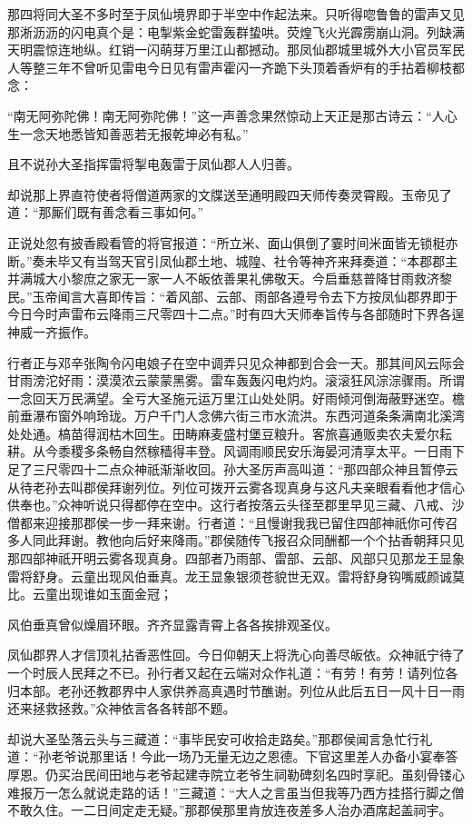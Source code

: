 \documentclass[12pt,UTF8]{ctexbook}
\begin{document}
{	那四将同大圣不多时至于凤仙境界即于半空中作起法来。只听得唿鲁鲁的雷声又见那淅沥沥的闪电真个是：电掣紫金蛇雷轰群蛰哄。荧煌飞火光霹雳崩山洞。列缺满天明震惊连地纵。红销一闪萌芽万里江山都撼动。那凤仙郡城里城外大小官员军民人等整三年不曾听见雷电今日见有雷声霍闪一齐跪下头顶着香炉有的手拈着柳枝都念：
	
	“南无阿弥陀佛！南无阿弥陀佛！”这一声善念果然惊动上天正是那古诗云：“人心生一念天地悉皆知善恶若无报乾坤必有私。”
	
	且不说孙大圣指挥雷将掣电轰雷于凤仙郡人人归善。
	
	却说那上界直符使者将僧道两家的文牒送至通明殿四天师传奏灵霄殿。玉帝见了道：“那厮们既有善念看三事如何。”
	
	正说处忽有披香殿看管的将官报道：“所立米、面山俱倒了霎时间米面皆无锁梃亦断。”奏未毕又有当驾天官引凤仙郡土地、城隍、社令等神齐来拜奏道：“本郡郡主并满城大小黎庶之家无一家一人不皈依善果礼佛敬天。今启垂慈普降甘雨救济黎民。”玉帝闻言大喜即传旨：“着风部、云部、雨部各遵号令去下方按凤仙郡界即于今日今时声雷布云降雨三尺零四十二点。”时有四大天师奉旨传与各部随时下界各逞神威一齐振作。
	
	行者正与邓辛张陶令闪电娘子在空中调弄只见众神都到合会一天。那其间风云际会甘雨滂沱好雨：漠漠浓云蒙蒙黑雾。雷车轰轰闪电灼灼。滚滚狂风淙淙骤雨。所谓一念回天万民满望。全亏大圣施元运万里江山处处阴。好雨倾河倒海蔽野迷空。檐前垂瀑布窗外响玲珑。万户千门人念佛六街三市水流洪。东西河道条条满南北溪湾处处通。槁苗得润枯木回生。田畴麻麦盛村堡豆粮升。客旅喜通贩卖农夫爱尔耘耕。从今黍稷多条畅自然稼穑得丰登。风调雨顺民安乐海晏河清享太平。一日雨下足了三尺零四十二点众神祇渐渐收回。孙大圣厉声高叫道：“那四部众神且暂停云从待老孙去叫郡侯拜谢列位。列位可拨开云雾各现真身与这凡夫亲眼看看他才信心供奉也。”众神听说只得都停在空中。这行者按落云头径至郡里早见三藏、八戒、沙僧都来迎接那郡侯一步一拜来谢。行者道：“且慢谢我我已留住四部神祇你可传召多人同此拜谢。教他向后好来降雨。”郡侯随传飞报召众同酬都一个个拈香朝拜只见那四部神祇开明云雾各现真身。四部者乃雨部、雷部、云部、风部只见那龙王显象雷将舒身。云童出现风伯垂真。龙王显象银须苍貌世无双。雷将舒身钩嘴威颜诚莫比。云童出现谁如玉面金冠；
	
	风伯垂真曾似燥眉环眼。齐齐显露青霄上各各挨排观圣仪。
	
	凤仙郡界人才信顶礼拈香恶性回。今日仰朝天上将洗心向善尽皈依。众神祇宁待了一个时辰人民拜之不已。孙行者又起在云端对众作礼道：“有劳！有劳！请列位各归本部。老孙还教郡界中人家供养高真遇时节醮谢。列位从此后五日一风十日一雨还来拯救拯救。”众神依言各各转部不题。
	
	却说大圣坠落云头与三藏道：“事毕民安可收拾走路矣。”那郡侯闻言急忙行礼道：“孙老爷说那里话！今此一场乃无量无边之恩德。下官这里差人办备小宴奉答厚恩。仍买治民间田地与老爷起建寺院立老爷生祠勒碑刻名四时享祀。虽刻骨镂心难报万一怎么就说走路的话！”三藏道：“大人之言虽当但我等乃西方挂搭行脚之僧不敢久住。一二日间定走无疑。”那郡侯那里肯放连夜差多人治办酒席起盖祠宇。
	
}
\end{document}
